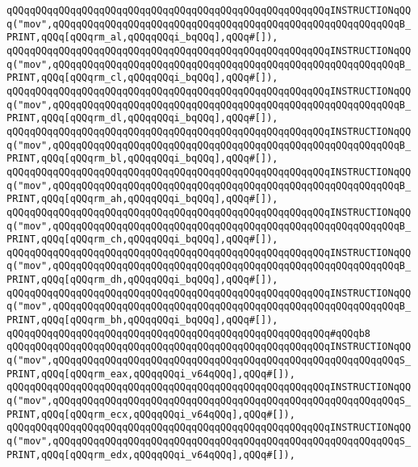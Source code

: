 \verb|qQQqqQQqqQQqqQQqqQQqqQQqqQQqqQQqqQQqqQQqqQQqqQQqqQQqqQQqINSTRUCTIONqQQq("mov",qQQqqQQqqQQqqQQqqQQqqQQqqQQqqQQqqQQqqQQqqQQqqQQqqQQqqQQqqQQqB_PRINT,qQQq[qQQqrm_al,qQQqqQQqi_bqQQq],qQQq#[]),|\newline
\verb|qQQqqQQqqQQqqQQqqQQqqQQqqQQqqQQqqQQqqQQqqQQqqQQqqQQqqQQqINSTRUCTIONqQQq("mov",qQQqqQQqqQQqqQQqqQQqqQQqqQQqqQQqqQQqqQQqqQQqqQQqqQQqqQQqqQQqB_PRINT,qQQq[qQQqrm_cl,qQQqqQQqi_bqQQq],qQQq#[]),|\newline
\verb|qQQqqQQqqQQqqQQqqQQqqQQqqQQqqQQqqQQqqQQqqQQqqQQqqQQqqQQqINSTRUCTIONqQQq("mov",qQQqqQQqqQQqqQQqqQQqqQQqqQQqqQQqqQQqqQQqqQQqqQQqqQQqqQQqqQQqB_PRINT,qQQq[qQQqrm_dl,qQQqqQQqi_bqQQq],qQQq#[]),|\newline
\verb|qQQqqQQqqQQqqQQqqQQqqQQqqQQqqQQqqQQqqQQqqQQqqQQqqQQqqQQqINSTRUCTIONqQQq("mov",qQQqqQQqqQQqqQQqqQQqqQQqqQQqqQQqqQQqqQQqqQQqqQQqqQQqqQQqqQQqB_PRINT,qQQq[qQQqrm_bl,qQQqqQQqi_bqQQq],qQQq#[]),|\newline
\verb|qQQqqQQqqQQqqQQqqQQqqQQqqQQqqQQqqQQqqQQqqQQqqQQqqQQqqQQqINSTRUCTIONqQQq("mov",qQQqqQQqqQQqqQQqqQQqqQQqqQQqqQQqqQQqqQQqqQQqqQQqqQQqqQQqqQQqB_PRINT,qQQq[qQQqrm_ah,qQQqqQQqi_bqQQq],qQQq#[]),|\newline
\verb|qQQqqQQqqQQqqQQqqQQqqQQqqQQqqQQqqQQqqQQqqQQqqQQqqQQqqQQqINSTRUCTIONqQQq("mov",qQQqqQQqqQQqqQQqqQQqqQQqqQQqqQQqqQQqqQQqqQQqqQQqqQQqqQQqqQQqB_PRINT,qQQq[qQQqrm_ch,qQQqqQQqi_bqQQq],qQQq#[]),|\newline
\verb|qQQqqQQqqQQqqQQqqQQqqQQqqQQqqQQqqQQqqQQqqQQqqQQqqQQqqQQqINSTRUCTIONqQQq("mov",qQQqqQQqqQQqqQQqqQQqqQQqqQQqqQQqqQQqqQQqqQQqqQQqqQQqqQQqqQQqB_PRINT,qQQq[qQQqrm_dh,qQQqqQQqi_bqQQq],qQQq#[]),|\newline
\verb|qQQqqQQqqQQqqQQqqQQqqQQqqQQqqQQqqQQqqQQqqQQqqQQqqQQqqQQqINSTRUCTIONqQQq("mov",qQQqqQQqqQQqqQQqqQQqqQQqqQQqqQQqqQQqqQQqqQQqqQQqqQQqqQQqqQQqB_PRINT,qQQq[qQQqrm_bh,qQQqqQQqi_bqQQq],qQQq#[]),|\newline
\verb|qQQqqQQqqQQqqQQqqQQqqQQqqQQqqQQqqQQqqQQqqQQqqQQqqQQqqQQq#qQQqb8|\newline
\verb|qQQqqQQqqQQqqQQqqQQqqQQqqQQqqQQqqQQqqQQqqQQqqQQqqQQqqQQqINSTRUCTIONqQQq("mov",qQQqqQQqqQQqqQQqqQQqqQQqqQQqqQQqqQQqqQQqqQQqqQQqqQQqqQQqqQQqS_PRINT,qQQq[qQQqrm_eax,qQQqqQQqi_v64qQQq],qQQq#[]),|\newline
\verb|qQQqqQQqqQQqqQQqqQQqqQQqqQQqqQQqqQQqqQQqqQQqqQQqqQQqqQQqINSTRUCTIONqQQq("mov",qQQqqQQqqQQqqQQqqQQqqQQqqQQqqQQqqQQqqQQqqQQqqQQqqQQqqQQqqQQqS_PRINT,qQQq[qQQqrm_ecx,qQQqqQQqi_v64qQQq],qQQq#[]),|\newline
\verb|qQQqqQQqqQQqqQQqqQQqqQQqqQQqqQQqqQQqqQQqqQQqqQQqqQQqqQQqINSTRUCTIONqQQq("mov",qQQqqQQqqQQqqQQqqQQqqQQqqQQqqQQqqQQqqQQqqQQqqQQqqQQqqQQqqQQqS_PRINT,qQQq[qQQqrm_edx,qQQqqQQqi_v64qQQq],qQQq#[]),|\newline
